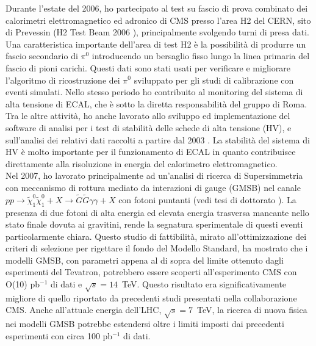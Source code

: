 \documentclass[10pt, a4paper]{article}
\begin{document}
Durante l'estate del 2006, ho partecipato al test su fascio di prova combinato dei calorimetri elettromagnetico 
ed adronico di CMS presso l'area H2 del CERN, sito di Prevessin (H2 Test Beam 2006 \cite{Abdullin:2009zz}), 
principalmente svolgendo turni di presa dati.
Una caratteristica importante dell'area di test H2 \`e la possibilit\`a di produrre un fascio secondario di $\pi^0$ 
introducendo un bersaglio fisso lungo la linea primaria del fascio di pioni carichi. Questi dati \cite{Adzic:2008zza} 
sono stati usati per verificare e migliorare l'algoritmo di ricostruzione dei $\pi^0$ sviluppato per gli studi di calibrazione 
con eventi simulati. Nello stesso periodo ho contribuito al monitoring del sistema di alta 
tensione di ECAL, che \`e sotto la diretta responsabilit\`a del gruppo di Roma. \\

Tra le altre attivit\`a, ho anche lavorato allo sviluppo ed implementazione del software di analisi per i test di stabilit\`a delle schede 
di alta tensione (HV), e sull'analisi dei relativi dati raccolti a partire dal 2003 \cite{Bartoloni:2007hx}. 
La stabilit\`a del sistema di HV \`e molto importante per il funzionamento di ECAL in quanto contribuisce 
direttamente alla risoluzione in energia del calorimetro elettromagnetico. \\

Nel 2007, ho lavorato principalmente ad un'analisi di ricerca di Supersimmetria con meccanismo di rottura mediato da 
interazioni di gauge (GMSB) nel canale 
$pp \rightarrow \tilde{\chi}_1^0 \tilde{\chi}_1^0 + X \rightarrow \tilde{G} \tilde{G} \gamma \gamma + X$  con fotoni puntanti  
(vedi tesi di dottorato \cite{Santanastasio:DOTTORATO}). 
La presenza di due fotoni di alta energia ed elevata energia trasversa mancante nello stato finale dovuta ai gravitini, 
rende la segnatura sperimentale di questi eventi particolarmente chiara. Questo studio di fattibilit\`a, mirato all'ottimizzazione 
dei criteri di selezione per rigettare il fondo del Modello Standard, ha mostrato che i modelli GMSB, con parametri appena al 
di sopra del limite ottenuto dagli esperimenti del Tevatron, potrebbero essere scoperti all'esperimento CMS 
con O(10) pb$^{-1}$ di dati e $\sqrt{s}=14$~TeV. Questo risultato era significativamente migliore di quello riportato da precedenti 
studi presentati nella collaborazione CMS. Anche all'attuale energia dell'LHC, $\sqrt{s}=7$~TeV, la ricerca di nuova fisica 
nei modelli GMSB potrebbe estendersi oltre i limiti imposti dai precedenti esperimenti con circa 100 pb$^{-1}$ di dati. 
\end{document}
